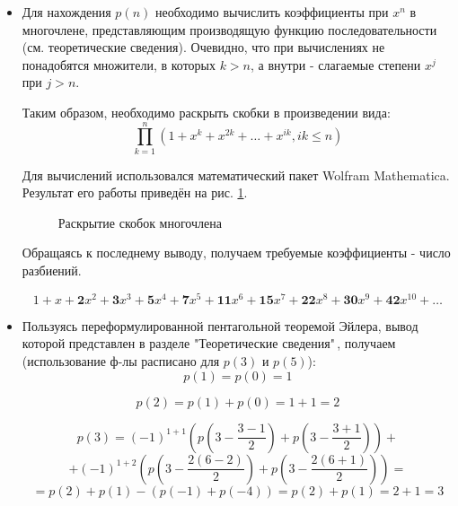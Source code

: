 \begin{itemize}
	\item Для нахождения $p(n)$ необходимо вычислить коэффициенты при $x^n$ в многочлене, представляющим производящую функцию последовательности (см. теоретические сведения). Очевидно, что при вычислениях не понадобятся множители, в которых $k > n$, а внутри - слагаемые степени $x^j$ при $j > n$.
	
	Таким образом, необходимо раскрыть скобки в произведении вида:
	\[ \prod_{k=1}^n (1 + x^k + x^{2k} + \dots + x^{ik}, ik \le n) \]
	
	Для вычислений использовался математический пакет Wolfram Mathematica. Результат его работы приведён на рис. \ref{fig:img_1}.
	
	\begin{figure}[H]
		\caption{Раскрытие скобок многочлена}
		\label{fig:img_1}
	\end{figure}

	Обращаясь к последнему выводу, получаем требуемые коэффициенты - число разбиений.
	
	\[ 1 + x + \mathbf{2}x^2 + \mathbf{3}x^3 + \mathbf{5}x^4 + \mathbf{7}x^5 + \mathbf{11}x^6 + \mathbf{15}x^7 + \mathbf{22}x^8 + \mathbf{30}x^9 + \mathbf{42}x^{10} + \dots \]
	
	\item Пользуясь переформулированной пентагольной теоремой Эйлера, вывод которой представлен в разделе "Теоретические сведения"\,, получаем (использование ф-лы расписано для $p(3)$ и $p(5)$):
	\[p(1) = p(0) = 1\]
	
	\[ p(2) = p(1) + p(0) = 1 + 1 = 2 \]
	
	\[ p(3) = (-1)^{1+1} \left(p\left(3-\frac{3-1}{2}\right) + p\left(3-\frac{3+1}{2}\right)\right) + \]
	\[ +(-1)^{1+2}\left(p\left(3-\frac{2(6-2)}{2}\right)+p\left(3-\frac{2(6+1)}{2}\right)\right) = \]
	\[ =p(2) + p(1) - (p(-1) + p(-4)) = p(2) + p(1) = 2 + 1 = 3 \]
	

\end{itemize}
